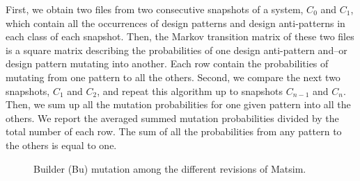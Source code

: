 First, we obtain two files from two consecutive snapshots of a system, $C_0$ and $C_1$, which contain all the occurrences of design patterns and design anti-patterns in each class of each snapshot. Then, the Markov transition matrix of these two files is a square matrix describing the probabilities of one design anti-pattern and--or design pattern mutating into another. Each row contain the probabilities of mutating from one pattern to all the others. Second, we compare the next two snapshots, $C_1$ and $C_2$, and repeat this algorithm up to snapshots $C_{n-1}$ and $C_n$. Then, we sum up all the mutation probabilities for one given pattern into all the others. We report the averaged summed mutation probabilities divided by the total number of each row. The sum of all the probabilities from any pattern to the others is equal to one. 

\begin{figure*}
\begin{center}
\caption{Builder (Bu) mutation among the different revisions of Matsim.}
\label{Figure:Bu-Mutations-Matsim2}
\end{center}
\end{figure*}

